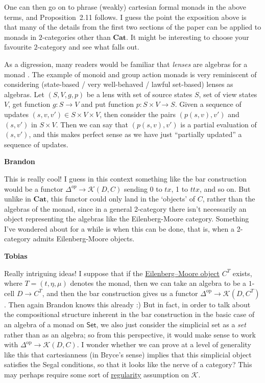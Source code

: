 \documentclass{amsart}
\newcommand{\respond}[1]{
  \vspace{1em} \textbf{#1}
}
\begin{document}
One can then go on to phrase (weakly) cartesian formal monads in the above terms,
and Proposition~2.11 follows.
I guess the point the exposition above is that many of the details from the first two
sections of the paper can be applied to monads in $2$-categories other than
$\mathbf{Cat}$.
It might be interesting to choose your favourite $2$-category and see what falls out.

As a digression, many readers would be familiar that \emph{lenses} are algebras
for a monad \cite{JRW}. The example of monoid and group action monads is very
reminiscent of considering (state-based / very well-behaved / lawful set-based)
lenses as algebras.
Let $(S, V, g, p)$ be a lens with set of source states $S$, set of view states $V$,
get function $g \colon S \rightarrow V$ and put function
$p \colon S \times V \rightarrow S$.
Given a sequence of updates $(s, v, v') \in S \times V \times V$, then consider
the pairs $(p(s, v), v')$ and $(s, v')$ in $S \times V$.
Then we can say that $(p(s, v), v')$ is a partial evaluation of $(s, v')$, and this
makes perfect sense as we have just ``partially updated'' a sequence of updates.

\respond{Brandon}

This is really cool! I guess in this context something like the bar construction would be a functor $\Delta^{op} \rightarrow \mathcal{K}(D,C)$ sending 0 to $tx$, 1 to $ttx$, and so on.  But unlike in $\mathbf{Cat}$, this functor could only land in the `objects' of $C$, rather than the algebras of the monad, since in a general 2-category there isn't necessarily an object representing the algebras like the Eilenberg-Moore category.  Something I've wondered about for a while is when this can be done, that is, when a 2-category admits Eilenberg-Moore objects.

\respond{Tobias}

Really intriguing ideas! I suppose that if the \href{https://ncatlab.org/nlab/show/Eilenberg-Moore+category}{Eilenberg--Moore object} $C^T$ exists, where $T = (t,\eta,\mu)$ denotes the monad, then we can take an algebra to be a $1$-cell $D\to C^T$, and then the bar construction gives us a functor $\Delta^{\mathrm{op}} \to \mathcal{K}(D,C^T)$. Then again Brandon knows this already :) But in fact, in order to talk about the compositional structure inherent in the bar construction in the basic case of an algebra of a monad on $\mathsf{Set}$, we also just consider the simplicial set as a \emph{set} rather than as an algebra; so from this perspective, it would make sense to work with $\Delta^{\mathrm{op}} \to \mathcal{K}(D,C)$. I wonder whether we can prove at a level of generality like this that cartesianness (in Bryce's sense) implies that this simplicial object satisfies the Segal conditions, so that it looks like the nerve of a category? This may perhaps require some sort of \href{https://ncatlab.org/nlab/show/regular+2-category}{regularity} assumption on $\mathcal{K}$.
\end{document}

